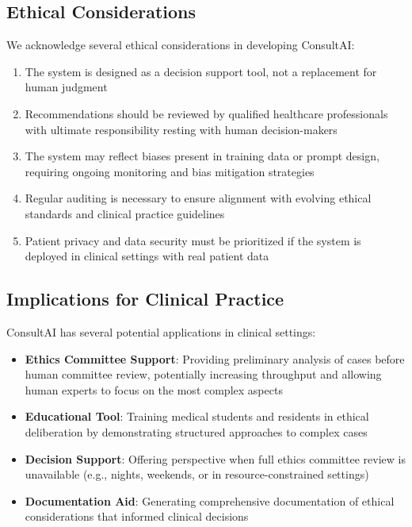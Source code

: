\documentclass[11pt]{article}
\begin{document}
\subsection{Ethical Considerations}

We acknowledge several ethical considerations in developing ConsultAI:
\begin{enumerate}
    \item The system is designed as a decision support tool, not a replacement for human judgment
    \item Recommendations should be reviewed by qualified healthcare professionals with ultimate responsibility resting with human decision-makers
    \item The system may reflect biases present in training data or prompt design, requiring ongoing monitoring and bias mitigation strategies
    \item Regular auditing is necessary to ensure alignment with evolving ethical standards and clinical practice guidelines
    \item Patient privacy and data security must be prioritized if the system is deployed in clinical settings with real patient data
\end{enumerate}

\subsection{Implications for Clinical Practice}

ConsultAI has several potential applications in clinical settings:

\begin{itemize}
    \item \textbf{Ethics Committee Support}: Providing preliminary analysis of cases before human committee review, potentially increasing throughput and allowing human experts to focus on the most complex aspects
    \item \textbf{Educational Tool}: Training medical students and residents in ethical deliberation by demonstrating structured approaches to complex cases
    \item \textbf{Decision Support}: Offering perspective when full ethics committee review is unavailable (e.g., nights, weekends, or in resource-constrained settings)
    \item \textbf{Documentation Aid}: Generating comprehensive documentation of ethical considerations that informed clinical decisions
\end{itemize}
\end{document}
